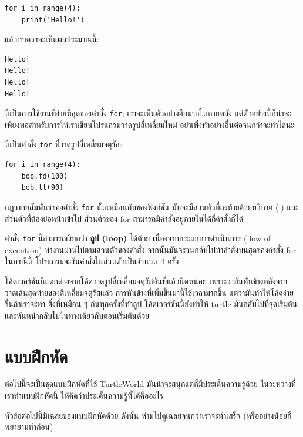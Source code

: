 \begin{verbatim}
for i in range(4):
    print('Hello!')
\end{verbatim}
%
แล้วเราควรจะเห็นผลประมาณนี้:

\begin{verbatim}
Hello!
Hello!
Hello!
Hello!
\end{verbatim}
%
นี่เป็นการใช้งานที่ง่ายที่สุดของคำสั่ง {\tt for}; เราจะเห็นตัวอย่างอีกมากในภายหลัง 
แต่ตัวอย่างนี้ก็น่าจะเพียงพอสำหรับการให้เราเขียนโปรแกรมวาดรูปสี่เหลี่ยมใหม่ 
อย่าเพิ่งทำอย่างอื่นต่อจนกว่าจะทำได้นะ

นี่เป็นคำสั่ง {\tt for} ที่วาดรูปสี่เหลี่ยมจตุรัส:

\begin{verbatim}
for i in range(4):
    bob.fd(100)
    bob.lt(90)
\end{verbatim}
%
กฎวากยสัมพันธ์ของคำสั่ง {\tt for} นั้นเหมือนกับของฟังก์ชัน มันจะมีส่วนหัวที่ลงท้ายด้วยทวิภาค (:)
และส่วนตัวที่ต้องย่อหน้าเข้าไป ส่วนตัวของ for สามารถมีคำสั่งอยู่ภายในได้กี่คำสั่งก็ได้

คำสั่ง {\tt for} นี้สามารถเรียกว่า {\bf ลูป (loop)} ได้ด้วย เนื่องจากกระแสการดำเนินการ 
(flow of execution) ทำงานผ่านไปตามส่วนตัวของคำสั่ง จากนั้นมันจะวนกลับไปทำคำสั่งบนสุดของคำสั่ง for  
ในกรณีนี้ โปรแกรมจะรันคำสั่งในส่วนตัวเป็นจำนวน 4 ครั้ง 

โค้ดเวอร์ชันนี้แตกต่างจากโค้ดวาดรูปสี่เหลี่ยมจตุรัสอันที่แล้วนิดหน่อย เพราะว่ามันหันข้างหลังจาก
วาดเส้นสุดท้ายของสี่เหลี่ยมจตุรัสแล้ว การหันข้างที่เพิ่มขึ้นมานี้ใช้เวลามากขึ้น แต่ว่ามันทำให้โค้ดง่ายขึ้นถ้าเราจะทำ
สิ่งที่เหมือน ๆ กันทุกครั้งที่ทำลูป โค้ดเวอร์ชันนี้ยังทำให้ turtle มันกลับไปที่จุดเริ่มต้น
และหันหน้ากลับไปในทางเดียวกับตอนเริ่มต้นด้วย


\section{แบบฝึกหัด}

ต่อไปนี้จะเป็นชุดแบบฝึกหัดที่ใช้ TurtleWorld มันน่าจะสนุกแต่ก็มีประเด็นความรู้ด้วย
ในระหว่างที่เราทำแบบฝึกหัดนี้ ให้คิดว่าประเด็นความรู้ที่ได้คืออะไร

หัวข้อต่อไปนี้มีเฉลยของแบบฝึกหัดด้วย ดังนั้น ห้ามไปดูเฉลยจนกว่าเราจะทำเสร็จ 
(หรืออย่างน้อยก็พยายามทำก่อน)

